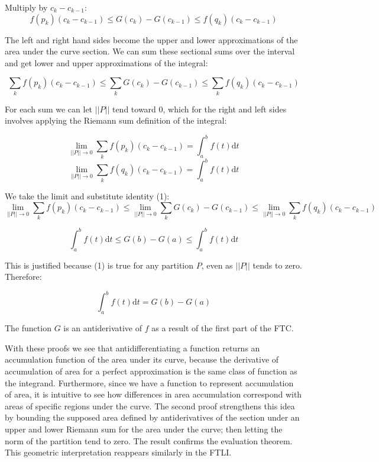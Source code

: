 \documentclass[11pt]{article}
\begin{document}
Multiply by $c_k-c_{k-1}$:
$$f(p_k)(c_k-c_{k-1})\leq G(c_k)-G(c_{k-1})\leq f(q_k)(c_k-c_{k-1})$$

The left and right hand sides become the upper and lower approximations of the area under the curve section. We can sum these sectional sums over the interval and get lower and upper approximations of the integral:

$$\sum_k f(p_k)(c_k-c_{k-1})\leq \sum_k G(c_k)-G(c_{k-1})\leq \sum_k f(q_k)(c_k-c_{k-1})$$

For each sum we can let  $||P||$ tend toward $0$, which for the right and left sides involves applying the Riemann sum definition of the integral:

$$\lim_{||P||\to 0}\sum_k f(p_k)(c_k-c_{k-1}) = \int_{a}^{b}{f(t)\mathrm{d}t}$$
$$\lim_{||P||\to 0}\sum_k f(q_k)(c_k-c_{k-1}) = \int_{a}^{b}{f(t)\mathrm{d}t}$$

We take the limit and substitute identity (1):
$$\lim_{||P||\to 0}\sum_k f(p_k)(c_k-c_{k-1})\leq \lim_{||P||\to 0} \sum_k G(c_k)-G(c_{k-1})\leq \lim_{||P||\to 0}\sum_k f(q_k)(c_k-c_{k-1})$$

$$\int_{a}^{b}{f(t)\mathrm{d}t}\leq G(b)-G(a)\leq \int_{a}^{b}{f(t)\mathrm{d}t}$$

This is justified because (1) is true for any partition $P$, even as $||P||$ tends to zero. Therefore:

$$\int_{a}^{b}{f(t)\mathrm{d}t} = G(b)-G(a)$$\normalsize

The function $G$ is an antiderivative of $f$ as a result of the first part of the FTC.


With these proofs we see that antidifferentiating a function returns an accumulation function of the area under its curve, because the derivative of accumulation of area for a perfect approximation is the same class of function as the integrand. Furthermore, since we have a function to represent accumulation of area, it is intuitive to see how differences in area accumulation correspond with areas of specific regions under the curve. The second proof strengthens this idea by bounding the supposed area defined by antiderivatives of the section under an upper and lower Riemann sum for the area under the curve; then letting the norm of the partition tend to zero. The result confirms the evaluation theorem. This geometric interpretation reappears similarly in the FTLI.
\end{document}
